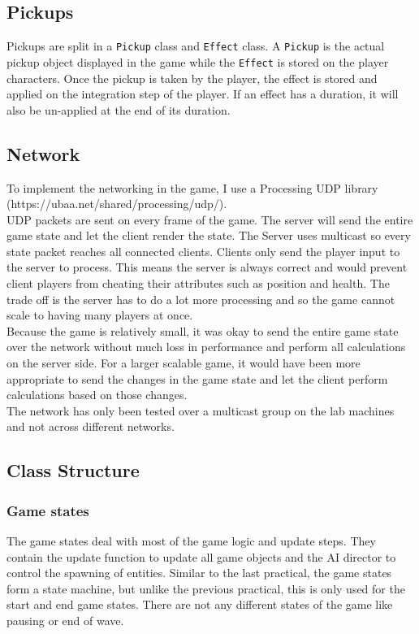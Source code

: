 \documentclass{article}
\newcommand{\n}[0]{\\[\baselineskip]}
\begin{document}
\subsection{Pickups}
Pickups are split in a \texttt{Pickup} class and \texttt{Effect} class. A \texttt{Pickup} is the actual pickup object displayed in the game while the \texttt{Effect} is stored on the player characters. Once the pickup is taken by the player, the effect is stored and applied on the integration step of the player. If an effect has a duration, it will also be un-applied at the end of its duration. 

\subsection{Network}
To implement the networking in the game, I use a Processing UDP library (https://ubaa.net/shared/processing/udp/).
\n
UDP packets are sent on every frame of the game. The server will send the entire game state and let the client render the state. The Server uses multicast so every state packet reaches all connected clients. Clients only send the player input to the server to process. This means the server is always correct and would prevent client players from cheating their attributes such as position and health. The trade off is the server has to do a lot more processing and so the game cannot scale to having many players at once.
\n
Because the game is relatively small, it was okay to send the entire game state over the network without much loss in performance and perform all calculations on the server side. For a larger scalable game, it would have been more appropriate to send the changes in the game state and let the client perform calculations based on those changes.
\n
The network has only been tested over a multicast group on the lab machines and not across different networks.

\subsection{Class Structure}

\subsubsection{Game states}
The game states deal with most of the game logic and update steps. They contain the update function to update all game objects and the AI director to control the spawning of entities. Similar to the last practical, the game states form a state machine, but unlike the previous practical, this is only used for the start and end game states. There are not any different states of the game like pausing or end of wave.
\end{document}

